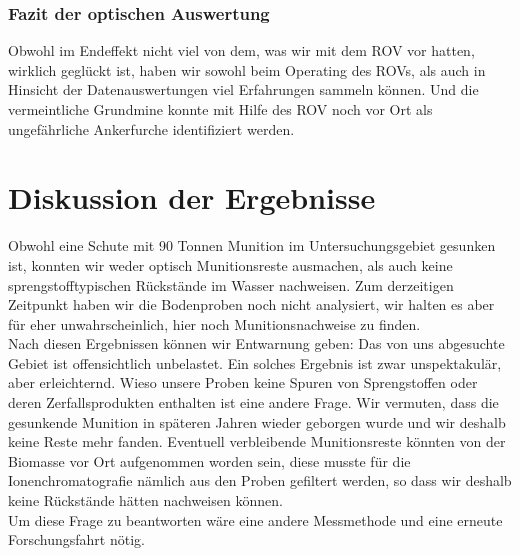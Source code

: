 \subsubsection{Fazit der optischen Auswertung}
Obwohl im Endeffekt nicht viel von dem, was wir mit dem ROV vor hatten, wirklich geglückt ist, haben wir sowohl beim Operating des ROVs, als auch in Hinsicht der Datenauswertungen viel Erfahrungen sammeln können. Und die vermeintliche Grundmine konnte mit Hilfe des ROV noch vor Ort als ungefährliche Ankerfurche identifiziert werden.




\section{Diskussion der Ergebnisse}
Obwohl eine Schute mit 90 Tonnen Munition im Untersuchungsgebiet gesunken ist, konnten wir weder optisch Munitionsreste ausmachen, als auch keine sprengstofftypischen Rückstände im Wasser nachweisen. Zum derzeitigen Zeitpunkt haben wir die Bodenproben noch nicht analysiert, wir halten es aber für eher unwahrscheinlich, hier noch Munitionsnachweise zu finden.
\\
Nach diesen Ergebnissen können wir Entwarnung geben: Das von uns abgesuchte Gebiet ist offensichtlich unbelastet. Ein solches Ergebnis ist zwar unspektakulär, aber erleichternd. Wieso 
unsere Proben keine Spuren von Sprengstoffen oder deren Zerfallsprodukten 
enthalten ist eine andere Frage. Wir vermuten, dass die gesunkende Munition in späteren Jahren wieder geborgen wurde und wir deshalb keine Reste mehr fanden.
Eventuell verbleibende Munitionsreste könnten von der Biomasse vor Ort aufgenommen worden sein, diese musste für die Ionenchromatografie nämlich aus den Proben gefiltert werden, so dass wir deshalb keine Rückstände hätten nachweisen können. \\ 
Um diese Frage zu beantworten wäre eine andere Messmethode und eine erneute Forschungsfahrt nötig.